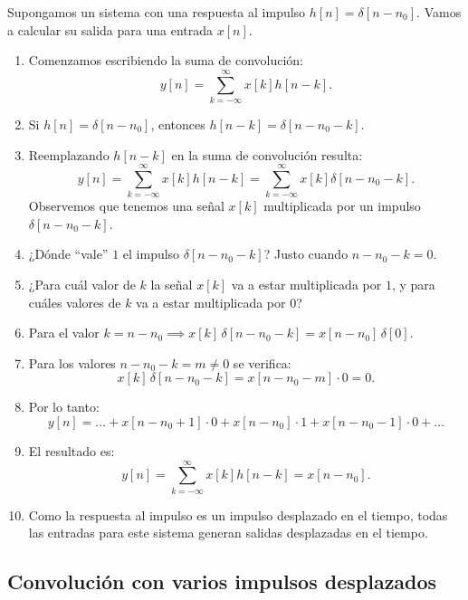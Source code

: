 Supongamos un sistema con una respuesta al impulso $h[n] = \delta[n - n_{0}]$. Vamos a calcular su salida para una entrada $x[n]$.

\begin{enumerate}
	\item Comenzamos escribiendo la suma de convolución:
	\begin{equation}
		y[n] = \sum_{k=-\infty}^{\infty} x[k] h[n-k].
	\end{equation}
	\item Si $h[n] = \delta[n - n_{0}]$, entonces $h[n - k] = \delta[n - n_{0} - k]$.
	\item Reemplazando $h[n - k]$ en la suma de convolución resulta:
	\begin{equation}
		y[n] = \sum_{k=-\infty}^{\infty} x[k] h[n-k] = \sum_{k=-\infty}^{\infty} x[k] \delta[n - n_{0} - k].
	\end{equation}
	Observemos que tenemos una señal $x[k]$ multiplicada por un impulso $\delta[n - n_{0} - k]$.
	\item ¿Dónde ``vale'' $1$ el impulso $\delta[n - n_{0} - k]$? Justo cuando $n - n_{0} - k = 0$.
	\item ¿Para cuál valor de $k$ la señal $x[k]$ va a estar multiplicada por $1$, y para cuáles valores de $k$ va a estar multiplicada por $0$?
	\item Para el valor $k = n - n_{0} \implies x[k] \, \delta[n - n_{0} - k] = x[n - n_{0}] \, \delta[0]$.
	\item Para los valores $n - n_{0} - k = m \neq 0$ se verifica:
	\begin{equation}
		x[k] \, \delta[n - n_{0} - k] = x[n - n_{0} - m] \cdot 0 = 0.
	\end{equation}
	\item Por lo tanto:
	\begin{equation}
		y[n] = \dots + x[n - n_{0} + 1] \cdot 0 + x[n - n_{0}] \cdot 1 + x[n - n_{0} - 1] \cdot 0 + \dots 
	\end{equation}
	\item El resultado es:
	\begin{equation}
		y[n] = \sum_{k=-\infty}^{\infty} x[k] h[n-k] = x[n - n_{0}].
	\end{equation}
	\item Como la respuesta al impulso es un impulso desplazado en el tiempo, todas las entradas para este sistema generan salidas desplazadas en el tiempo.
\end{enumerate}

\subsection{Convolución con varios impulsos desplazados}

